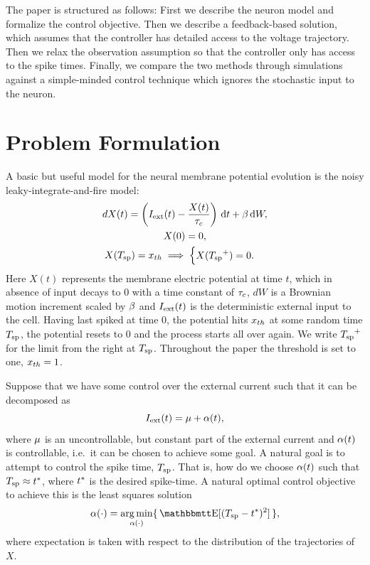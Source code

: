 \documentclass[12pt]{iopart}
\begin{document}
The paper is structured as follows: First we describe the neuron model and
formalize the control objective. Then we describe a feedback-based solution,
which assumes that the controller has detailed access to the voltage trajectory.
Then we relax the observation assumption so that the controller only has access
to the spike times. Finally, we compare the two methods through
simulations against a simple-minded control technique which ignores
the stochastic input to the neuron.

\section{Problem Formulation}
A basic but useful model for the neural membrane potential evolution is the
noisy leaky-integrate-and-fire model:
\begin{equation}
\begin{gathered}
dX(t) = \left({ I_{\textrm{ext}} }(t) - \frac{X(t)}{{ \tau_{c} }} \right) \, \mathrm{d} t + {\beta} \, \mathrm{d} W,
\\
X(0) = 0,
\\
X({ T_{\textrm{sp} } }) = { x_{th} } \implies
\begin{cases}
X({ T_{\textrm{sp} } }^+) = 0. & 
\end{cases}
\end{gathered}
\label{eq:X_evolution_uo}
\end{equation}
Here $X(t)$ represents the membrane electric potential at time $t$, which in
absence of input decays to $0$ with a time constant of ${ \tau_{c} }$, $dW$ is a Brownian
motion increment scaled by ${\beta}$ and ${ I_{\textrm{ext}} }(t)$ is the deterministic external input to the cell. Having last
spiked at time $0$, the potential hits ${ x_{th} }$ at some random time ${ T_{\textrm{sp} } }$, the
potential resets to $0$ and the process starts all over again. 
We write ${ T_{\textrm{sp} } }^+$ for the limit from the right at ${ T_{\textrm{sp} } }$.
Throughout the paper the threshold is set to one, ${ x_{th} } = 1$.

Suppose that we have some control over the external current such that it can be
decomposed as
\begin{equation}
{ I_{\textrm{ext}} }(t) = {\mu } + {\alpha}(t),
\label{eq:current_mu_alpha}
\end{equation}
where ${\mu }$ is an uncontrollable, but constant part of the external current and
${\alpha}(t)$ is controllable, i.e.\ it can be chosen to achieve some goal.
A natural goal is to attempt to control the spike time, ${ T_{\textrm{sp} } }$.
That is, how do we choose ${\alpha}(t)$ such that ${ T_{\textrm{sp} } } \approx { t^* }$, where ${ t^* }$ is the
desired spike-time. A natural optimal control objective to achieve this is the
least squares solution
\begin{equation}
\a(\cdot) = \argmin_{\a(\cdot)} \{\, \Exp[(\ts- \T)^2] \,\},
\label{eq:OC_LS_variance}
\end{equation}
where expectation is taken with respect to the distribution of the trajectories
of $X$.
\end{document}
